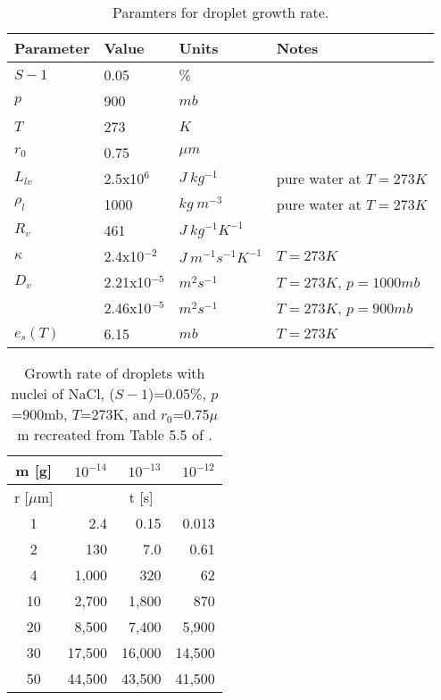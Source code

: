 \documentclass[]{article}
\newcommand{\ra}[1]{\renewcommand{\arraystretch}{#1}}
\begin{document}
\begin{table}[h]
    \centering
    \caption{Paramters for droplet growth rate.}
    \label{tab:parameters}

    \begin{tabular}{l l l l}
    \toprule
    Parameter & Value & Units & Notes\\
    \midrule
    $S - 1$   & 0.05            & \%                         & \\
    $p$       & 900             & $mb$                       & \\
    $T$       & 273             & $K$                        & \\
    $r_0$     & 0.75            & $\mu m$                    & \\
    $L_{lv}$  & 2.5x10$^{6}$    & $J \ kg^{-1}$              & pure water at $T=273 K$ \\
    $\rho_l$  & 1000            & $kg \ m^{-3}$              & pure water at $T=273 K$ \\
    $R_v$     & 461             & $J \ kg^{-1} K^{-1}$       & \\
    $\kappa$  & 2.4x10$^{-2}$   & $J \ m^{-1} s^{-1} K^{-1}$ & $T=273 K$ \\
    $D_v$     & 2.21x10$^{-5}$  & $m^2 s^{-1}$               & $T=273 K$, $p=1000 mb$ \\
              & 2.46x10$^{-5}$  & $m^2 s^{-1}$               & $T=273 K$, $p=900 mb$ \\
    $e_s (T)$ & 6.15            & $mb$                       & $T=273 K$\\
    \bottomrule
    \end{tabular}
\end{table}


\begin{table}[h]
    \centering
    \caption{Growth rate of droplets with nuclei of NaCl, ($S - 1$)=0.05\%,
        $p$=900mb, $T$=273K, and $r_0$=0.75$\mu$m recreated from Table 5.5 of \cite{Curry}.}

    \ra{1.2}
    \begin{tabular}{@{} c r r r @{}}
        \\
        \toprule
        m [g] & $10^{-14}$ & $10^{-13}$ & $10^{-12}$ \\
        \midrule
        r [$\mu$m] & \multicolumn{3}{c}{t [s]} \\
        \midrule
        1  & 2.4    & 0.15   & 0.013 \\
        2  & 130    & 7.0    & 0.61 \\
        4  & 1,000  & 320    & 62 \\
        10 & 2,700  & 1,800  & 870 \\
        20 & 8,500  & 7,400  & 5,900 \\
        30 & 17,500 & 16,000 & 14,500 \\
        50 & 44,500 & 43,500 & 41,500 \\
        \bottomrule
    \end{tabular}
\end{table}
\end{document}
